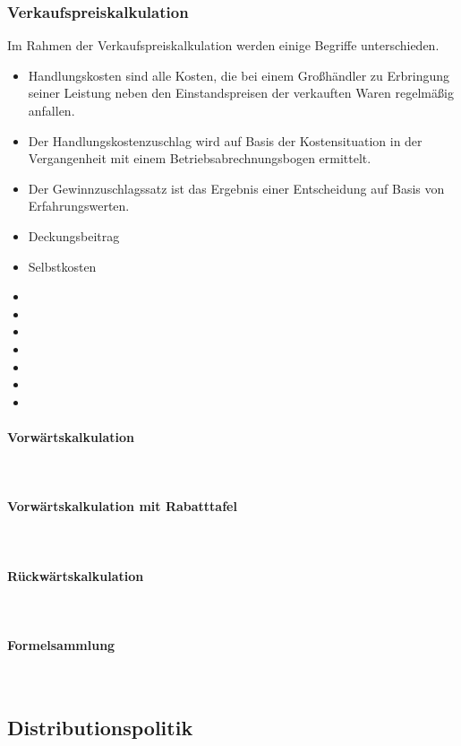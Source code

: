 {			 
\subsubsection{Verkaufspreiskalkulation}

Im Rahmen der Verkaufspreiskalkulation werden einige Begriffe unterschieden.

\begin{itemize}
	\item Handlungskosten sind alle Kosten, die bei einem Großhändler zu Erbringung seiner Leistung neben den Einstandspreisen der verkauften Waren regelmäßig anfallen.
	\item Der Handlungskostenzuschlag wird auf Basis der Kostensituation in der Vergangenheit mit einem Betriebsabrechnungsbogen ermittelt.
	\item Der Gewinnzuschlagssatz ist das Ergebnis einer Entscheidung auf Basis von Erfahrungswerten.
	\item Deckungsbeitrag
	\item Selbstkosten
	\item 
	\item 
	\item 
	\item 
	\item 
	\item 
	\item 
\end{itemize}

\paragraph{Vorwärtskalkulation}~\\
\paragraph{Vorwärtskalkulation mit Rabatttafel}~\\
\paragraph{Rückwärtskalkulation}~\\
\paragraph{Formelsammlung}~\\		 
			 
			 
\subsection{Distributionspolitik}


}
